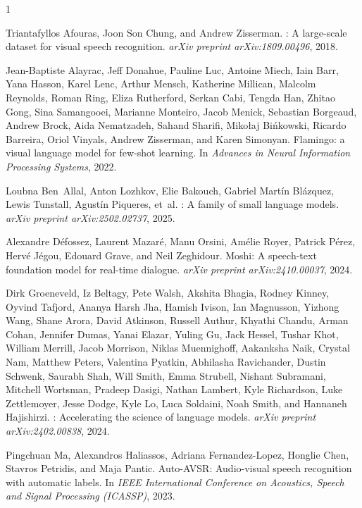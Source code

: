 \documentclass{article}
\begin{document}
\begin{thebibliography}{1}

Triantafyllos Afouras, Joon Son Chung, and Andrew Zisserman.
: A large-scale dataset for visual speech recognition.
\newblock \emph{arXiv preprint arXiv:1809.00496}, 2018.

Jean-Baptiste Alayrac, Jeff Donahue, Pauline Luc, Antoine Miech, Iain Barr,
Yana Hasson, Karel Lenc, Arthur Mensch, Katherine Millican, Malcolm Reynolds,
Roman Ring, Eliza Rutherford, Serkan Cabi, Tengda Han, Zhitao Gong, Sina
Samangooei, Marianne Monteiro, Jacob Menick, Sebastian Borgeaud, Andrew Brock,
Aida Nematzadeh, Sahand Sharifi, Miko{\l}aj Bi{\'n}kowski, Ricardo Barreira,
Oriol Vinyals, Andrew Zisserman, and Karen Simonyan.
\newblock Flamingo: a visual language model for few-shot learning.
\newblock In \emph{Advances in Neural Information Processing Systems}, 2022.

Loubna Ben~Allal, Anton Lozhkov, Elie Bakouch, Gabriel Mart{\'i}n Bl{\'a}zquez,
Lewis Tunstall, Agust{\'i}n Piqueres, et~al.
: A family of small language models.
\newblock \emph{arXiv preprint arXiv:2502.02737}, 2025.

Alexandre D{\'e}fossez, Laurent Mazar{\'e}, Manu Orsini, Am{\'e}lie Royer,
Patrick P{\'e}rez, Herv{\'e} J{\'e}gou, Edouard Grave, and Neil Zeghidour.
\newblock Moshi: A speech-text foundation model for real-time dialogue.
\newblock \emph{arXiv preprint arXiv:2410.00037}, 2024.

Dirk Groeneveld, Iz Beltagy, Pete Walsh, Akshita Bhagia, Rodney Kinney,
Oyvind Tafjord, Ananya Harsh Jha, Hamish Ivison, Ian Magnusson, Yizhong Wang,
Shane Arora, David Atkinson, Russell Authur, Khyathi Chandu, Arman Cohan,
Jennifer Dumas, Yanai Elazar, Yuling Gu, Jack Hessel, Tushar Khot,
William Merrill, Jacob Morrison, Niklas Muennighoff, Aakanksha Naik,
Crystal Nam, Matthew Peters, Valentina Pyatkin, Abhilasha Ravichander,
Dustin Schwenk, Saurabh Shah, Will Smith, Emma Strubell, Nishant Subramani,
Mitchell Wortsman, Pradeep Dasigi, Nathan Lambert, Kyle Richardson,
Luke Zettlemoyer, Jesse Dodge, Kyle Lo, Luca Soldaini, Noah Smith, and
Hannaneh Hajishirzi.
: Accelerating the science of language models.
\newblock \emph{arXiv preprint arXiv:2402.00838}, 2024.

Pingchuan Ma, Alexandros Haliassos, Adriana Fernandez-Lopez, Honglie Chen,
Stavros Petridis, and Maja Pantic.
\newblock Auto-{AVSR}: Audio-visual speech recognition with automatic labels.
\newblock In \emph{IEEE International Conference on Acoustics, Speech and
Signal Processing (ICASSP)}, 2023.

\end{thebibliography}
\end{document}
